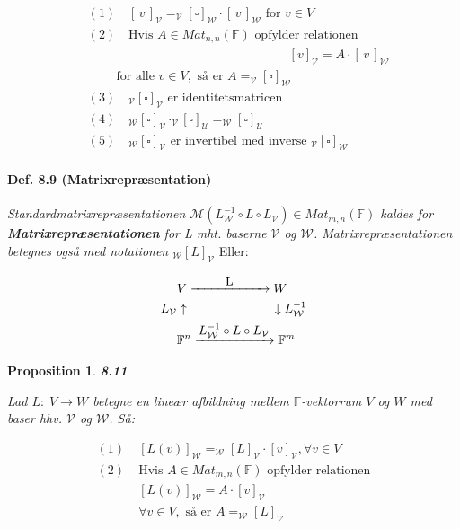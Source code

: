 \documentclass[paper=a4, fontsize=11pt]{scrartcl} %
\newtheorem*{proposition}{Proposition}
\newenvironment{cstmproposition}[1]{\begin{proposition} {\normalfont\textbf{#1}}}{\end{proposition}}
\begin{document}
	
	\begin{align*}
	&(1) \quad [\,v\,]_{\mathcal{V}} = _{\mathcal{V}}[{{\scriptstyle\square}}]_{\mathcal{W}} \cdot [\,v\,]_{\mathcal{W}} \text{ for } v \in V\\
	&(2) \quad \text{Hvis } A \in Mat_{n,n}(\mathbb{F}) \text{ opfylder relationen}\\
	&\qquad \qquad\qquad\qquad\qquad\qquad\qquad\qquad[v]_{\mathcal{V}} = A \cdot [\,v\,]_{\mathcal{W}}\\
	&\qquad \; \text{for alle } v \in V, \text{ så er } A = _{\mathcal{V}}[{\scriptstyle\square}]_{\mathcal{W}}\\
	&(3) \quad _{\mathcal{V}}[{\scriptstyle\square}]_{\mathcal{V}} \text{ er identitetsmatricen} \\
	&(4) \quad _{\mathcal{W}}[{\scriptstyle\square}]_{\mathcal{V}} \cdot _{\mathcal{V}}[{\scriptstyle\square}]_{\mathcal{U}} = _{\mathcal{W}}[{\scriptstyle\square}]_{\mathcal{U}}\\
	&(5) \quad _{\mathcal{W}}[{\scriptstyle\square}]_{\mathcal{V}} \text{ er invertibel med inverse } _{\mathcal{V}}[{\scriptstyle\square}]_{\mathcal{W}}
	\end{align*}
	
	
	
	
	\paragraph{Def. 8.9 (Matrixrepræsentation)}
	
	\textit{Standardmatrixrepræsentationen $\mathcal{M}(L_{\mathcal{W}}^{-1} \circ L \circ L_{\mathcal{V}}) \in Mat_{m,n}(\mathbb{F})$ kaldes for \textbf{Matrixrepræsentationen} for L mht. baserne $\mathcal{V}$ og $\mathcal{W}$. Matrixrepræsentationen betegnes også med notationen $_{\mathcal{W}}[L]_{\mathcal{V}}$}
	Eller:
	
	\begin{align*}
	&V \xrightarrow{\makebox[2cm]{L}} W\\
	L_{\mathcal{V}} & \uparrow \qquad \qquad \qquad \quad \downarrow L_{\mathcal{W}}^{-1}\\
	&\mathbb{F}^n \xrightarrow{\makebox[2cm]{$L_{\mathcal{W}}^{-1} \circ L \circ L_{\mathcal{V}}$}} \mathbb{F}^m
	\end{align*}
	
	\begin{cstmproposition}{8.11}
		
		Lad $L: \; V \rightarrow W$ betegne en lineær afbildning mellem $\mathbb{F}$-vektorrum $V$ og $W$ med baser hhv. $\mathcal{V}$ og $\mathcal{W}$. Så:
		
		\begin{align*}
		(1) \; &[L(v)]_{\mathcal{W}} = _{\mathcal{W}}[L]_{\mathcal{V}} \cdot [v]_{\mathcal{V}}, \forall v \in V\\
		(2) \; &\mbox{Hvis } A \in Mat_{m,n}(\mathbb{F}) \mbox{ opfylder relationen}\\
		&[L(v)]_{\mathcal{W}} = A \cdot [v]_{\mathcal{V}}\\
		&\forall v \in V, \mbox{ så er } A = _{\mathcal{W}}[L]_{\mathcal{V}}
		\end{align*}
		
		
	\end{cstmproposition}
	
\end{document}
